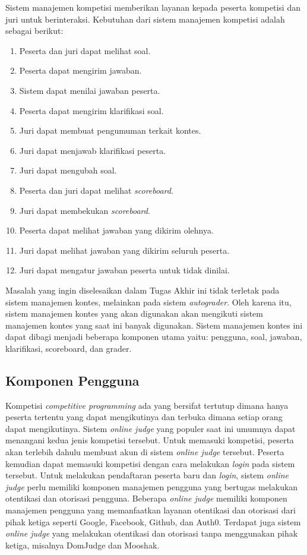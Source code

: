 \par Sistem manajemen kompetisi memberikan layanan kepada peserta kompetisi dan juri untuk berinteraksi. Kebutuhan dari sistem manajemen kompetisi adalah sebagai berikut:

\begin{enumerate}
    \item Peserta dan juri dapat melihat soal.
    \item Peserta dapat mengirim jawaban.
    \item Sistem dapat menilai jawaban peserta.
    \item Peserta dapat mengirim klarifikasi soal.
    \item Juri dapat membuat pengumuman terkait kontes.
    \item Juri dapat menjawab klarifikasi peserta.
    \item Juri dapat mengubah soal.
    \item Peserta dan juri dapat melihat \textit{scoreboard}.
    \item Juri dapat membekukan \textit{scoreboard}.
    \item Peserta dapat melihat jawaban yang dikirim olehnya.
    \item Juri dapat melihat jawaban yang dikirim seluruh peserta.
    \item Juri dapat mengatur jawaban peserta untuk tidak dinilai.
\end{enumerate}

\par Masalah yang ingin diselesaikan dalam Tugas Akhir ini tidak terletak pada sistem manajemen kontes, melainkan pada sistem \textit{autograder}. Oleh karena itu, sistem manajemen kontes yang akan digunakan akan mengikuti sistem manajemen kontes yang saat ini banyak digunakan. Sistem manajemen kontes ini dapat dibagi menjadi beberapa komponen utama yaitu: pengguna, soal, jawaban, klarifikasi, scoreboard, dan grader.

\subsection{Komponen Pengguna}

\par Kompetisi \textit{competitive programming} ada yang bersifat tertutup dimana hanya peserta tertentu yang dapat mengikutinya dan terbuka dimana setiap orang dapat mengikutinya. Sistem \textit{online judge} yang populer saat ini umumnya dapat menangani kedua jenis kompetisi tersebut. Untuk memasuki kompetisi, peserta akan terlebih dahulu membuat akun di sistem \textit{online judge} tersebut. Peserta kemudian dapat memasuki kompetisi dengan cara melakukan \textit{login} pada sistem tersebut. Untuk melakukan pendaftaran peserta baru dan \textit{login}, sistem \textit{online judge} perlu memiliki komponen manajemen pengguna yang bertugas melakukan otentikasi dan otorisasi pengguna. Beberapa \textit{online judge} memiliki komponen manajemen pengguna yang memanfaatkan layanan otentikasi dan otorisasi dari pihak ketiga seperti Google, Facebook, Github, dan Auth0. Terdapat juga sistem \textit{online judge} yang melakukan otentikasi dan otorisasi tanpa menggunakan pihak ketiga, misalnya DomJudge dan Mooshak.


